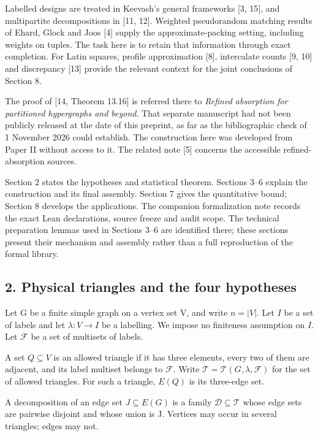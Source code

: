\documentclass[english,11pt,a4paper]{article}
\begin{document}
Labelled designs are treated in Keevash's general frameworks {[}3, 15{]}, and multipartite decompositions in {[}11, 12{]}. Weighted pseudorandom matching results of Ehard, Glock and Joos {[}4{]} supply the approximate-packing setting, including weights on tuples. The task here is to retain that information through exact completion. For Latin squares, profile approximation {[}8{]}, intercalate counts {[}9, 10{]} and discrepancy {[}13{]} provide the relevant context for the joint conclusions of Section 8.

The proof of {[}14, Theorem 13.16{]} is referred there to \emph{Refined absorption for partitioned hypergraphs and beyond}. That separate manuscript had not been publicly released at the date of this preprint, as far as the bibliographic check of 1 November 2026 could establish. The construction here was developed from Paper II without access to it. The related note {[}5{]} concerns the accessible refined-absorption sources.

Section 2 states the hypotheses and statistical theorem. Sections 3--6 explain the construction and its final assembly. Section 7 gives the quantitative bound; Section 8 develops the applications. The companion formalization note records the exact Lean declarations, source freeze and audit scope. The technical preparation lemmas used in Sections 3--6 are identified there; these sections present their mechanism and assembly rather than a full reproduction of the formal library.

\subsection{2. Physical triangles and the four hypotheses}\label{physical-triangles-and-the-four-hypotheses}

Let G be a finite simple graph on a vertex set V, and write \(n=|V|\). Let \(I\) be a set of labels and let \(\lambda:V\to I\) be a labelling. We impose no finiteness assumption on \(I\). Let \(\mathcal F\) be a set of multisets of labels.

A set \(Q\subseteq V\) is an allowed triangle if it has three elements, every two of them are adjacent, and its label multiset belongs to \(\mathcal F\). Write \(\mathcal T=\mathcal T(G,\lambda,\mathcal F)\) for the set of allowed triangles. For such a triangle, \(E(Q)\) is its three-edge set.

A decomposition of an edge set \(J\subseteq E(G)\) is a family \(\mathcal D\subseteq\mathcal T\) whose edge sets are pairwise disjoint and whose union is J. Vertices may occur in several triangles; edges may not.
\end{document}
